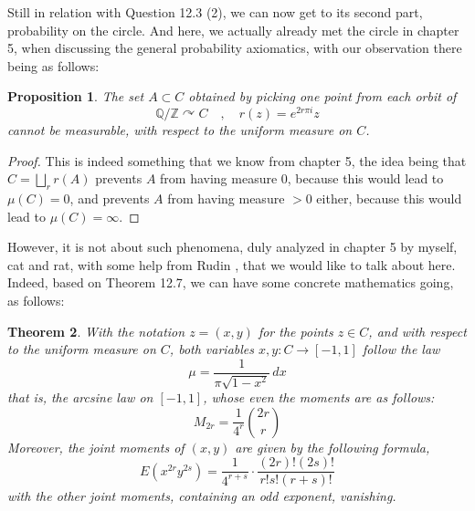 \documentclass[12pt]{amsbook}
\newtheorem{theorem}{Theorem}[chapter]
\newtheorem{proposition}[theorem]{Proposition}
\begin{document}
Still in relation with Question 12.3 (2), we can now get to its second part, probability on the circle. And here, we actually already met the circle in chapter 5, when discussing the general probability axiomatics, with our observation there being as follows:

\begin{proposition}
The set $A\subset C$ obtained by picking one point from each orbit of
$$\mathbb Q/\mathbb Z\curvearrowright C\quad,\quad r(z)=e^{2r\pi i}z$$
cannot be measurable, with respect to the uniform measure on $C$.
\end{proposition}

\begin{proof}
This is indeed something that we know from chapter 5, the idea being that $C=\bigsqcup_rr(A)$ prevents $A$ from having measure 0, because this would lead to $\mu(C)=0$, and prevents $A$ from having measure $>0$ either, because this would lead to $\mu(C)=\infty$.
\end{proof}

However, it is not about such phenomena, duly analyzed in chapter 5 by myself, cat and rat, with some help from Rudin \cite{rud}, that we would like to talk about here. Indeed, based on Theorem 12.7, we can have some concrete mathematics going, as follows:

\begin{theorem}
With the notation $z=(x,y)$ for the points $z\in C$, and with respect to the uniform measure on $C$, both variables $x,y:C\to[-1,1]$ follow the law
$$\mu=\frac{1}{\pi\sqrt{1-x^2}}\,dx$$
that is, the arcsine law on $[-1,1]$, whose even the moments are as follows:
$$M_{2r}=\frac{1}{4^r}\binom{2r}{r}$$
Moreover, the joint moments of $(x,y)$ are given by the following formula,
$$E(x^{2r}y^{2s})=\frac{1}{4^{r+s}}\cdot\frac{(2r)!(2s)!}{r!s!(r+s)!}$$
with the other joint moments, containing an odd exponent, vanishing.
\end{theorem}
\end{document}
